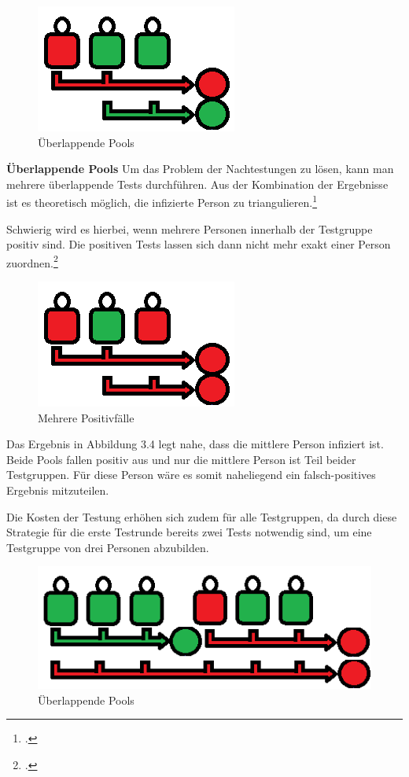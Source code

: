 \begin{figure}[h]
	\centering
	\includegraphics[width=.4\textwidth]{img/KomplexePools}
	\caption{Überlappende Pools\footnotemark}
\end{figure}

\textbf{Überlappende Pools}\newline
Um das Problem der Nachtestungen zu lösen, kann man mehrere überlappende Tests durchführen.
Aus der Kombination der Ergebnisse ist es theoretisch möglich, die infizierte Person zu triangulieren.\footcite{verwilt_evaluation_2021}

Schwierig wird es hierbei, wenn mehrere Personen innerhalb der Testgruppe positiv sind.
Die positiven Tests lassen sich dann nicht mehr exakt einer Person zuordnen.\footcite{viehweger_increased_2020}
\cleardoublepage

\begin{figure}[h]
	\centering
	\includegraphics[width=.4\textwidth]{img/MehrerePositiv}
	\caption{Mehrere Positivfälle\footnotemark}
\end{figure}
Das Ergebnis in Abbildung 3.4 legt nahe, dass die mittlere Person infiziert ist.
Beide Pools fallen positiv aus und nur die mittlere Person ist Teil beider Testgruppen.
Für diese Person wäre es somit naheliegend ein falsch-positives Ergebnis mitzuteilen.

Die Kosten der Testung erhöhen sich zudem für alle Testgruppen, da durch diese Strategie für die erste Testrunde bereits zwei Tests notwendig sind, um eine Testgruppe von drei Personen abzubilden.

\begin{figure}[h]
	\centering
	\includegraphics[width=.8\textwidth]{img/GrossePooluebersicht}
	\caption{Überlappende Pools\footnotemark}
\end{figure}

